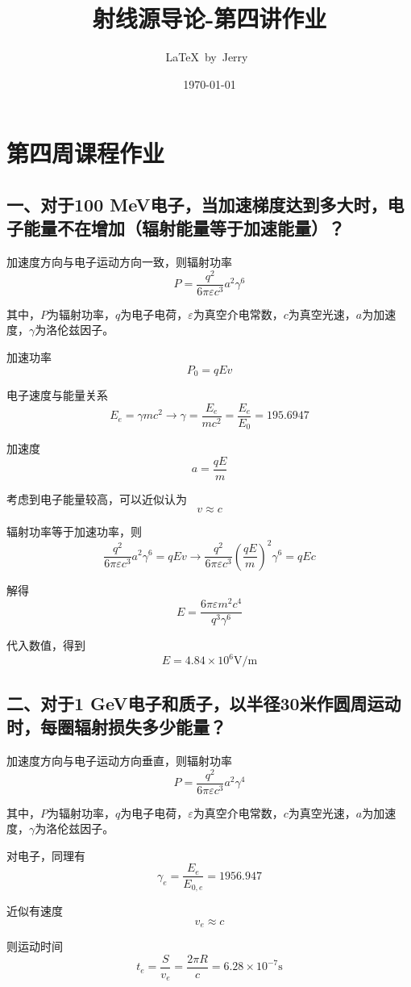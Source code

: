 \documentclass{article}
\title{射线源导论-第四讲作业}
\author{\LaTeX\ by\ Jerry\ }
\date{\today}
\begin{document}
\pagestyle{fancy}

\fancyhead[R]{\today}

\section*{第四周课程作业}

\subsection*{一、对于100 MeV电子，当加速梯度达到多大时，电子能量不在增加（辐射能量等于加速能量）？}

加速度方向与电子运动方向一致，则辐射功率 $$P = \frac{q^2}{6\pi\varepsilon c^3}a^2\gamma^6$$

其中，$P$为辐射功率，$q$为电子电荷，$\varepsilon$为真空介电常数，$c$为真空光速，$a$为加速度，$\gamma$为洛伦兹因子。

加速功率 $$P_0 = qEv $$

电子速度与能量关系 $$E_e = \gamma m c^2 \rightarrow \gamma = \frac{E_e}{mc^2} = \frac{E_e}{E_0} = 195.6947$$

加速度$$ a = \frac{qE}{m} $$

考虑到电子能量较高，可以近似认为$$ v \approx c$$

辐射功率等于加速功率，则 $$\frac{q^2}{6\pi\varepsilon c^3}a^2\gamma^6 = qEv \rightarrow \frac{q^2}{6\pi\varepsilon c^3}\left(\frac{qE}{m}\right)^2\gamma^6 = qEc $$

解得$$E = \frac{6\pi\varepsilon m^2 c^4}{q^3 \gamma^6}$$

代入数值，得到$$ E = 4.84 \times {10}^{6} \text{V/m}$$

\subsection*{二、对于1 GeV电子和质子，以半径30米作圆周运动时，每圈辐射损失多少能量？}

加速度方向与电子运动方向垂直，则辐射功率 $$P = \frac{q^2}{6\pi\varepsilon c^3}a^2\gamma^4$$

其中，$P$为辐射功率，$q$为电子电荷，$\varepsilon$为真空介电常数，$c$为真空光速，$a$为加速度，$\gamma$为洛伦兹因子。

对电子，同理有$$\gamma_e = \frac{E_e}{E_{0, e}} = 1956.947$$

近似有速度 $$ v_e \approx c $$

则运动时间 $$ t_e = \frac{S}{v_e} = \frac{2\pi R}{c} = 6.28 \times {10}^{-7} \text{s}$$
\end{document}
